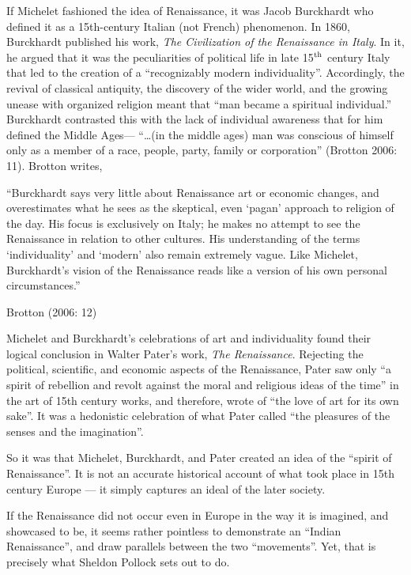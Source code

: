 If Michelet fashioned the idea of Renaissance, it was Jacob Burckhardt who defined it as a 15th-century Italian (not French) phenomenon. In 1860, Burckhardt published his work, {\sl The Civilization of the Renaissance in Italy}. In it, he argued that it was the peculiarities of political life in late 15$^{\rm th}$ century Italy that led to the creation of a “recognizably modern individuality”. Accordingly, the revival of classical antiquity, the discovery of the wider world, and the growing unease with organized religion meant that “man became a spiritual individual.” Burckhardt contrasted this with the lack of individual awareness that for him defined the Middle Ages—  “…(in the middle ages) man was conscious of himself only as a member of a race, people, party, family or corporation” (Brotton 2006: 11). Brotton writes,
\begin{myquote}
“Burckhardt says very little about Renaissance art or economic changes, and overestimates what he sees as the skeptical, even ‘pagan’ approach to religion of the day. His focus is exclusively on Italy; he makes no attempt to see the Renaissance in relation to other cultures. His understanding of the terms ‘individuality’ and ‘modern’ also remain extremely vague. Like Michelet, Burckhardt’s vision of the Renaissance reads like a version of his own personal circumstances.”  

\hfill{Brotton (2006: 12)}
\end{myquote}

Michelet and Burckhardt’s celebrations of art and individuality found their logical conclusion in Walter Pater’s work, {\sl The Renaissance}. Rejecting the political, scientific, and economic aspects of the Renaissance, Pater saw only “a spirit of rebellion and revolt against the moral and religious ideas of the time” in the art of 15th century works, and therefore, wrote of “the love of art for its own sake”. It was a hedonistic celebration of what Pater called “the pleasures of the senses and the imagination”.  

So it was that Michelet, Burckhardt, and Pater created an idea of the “spirit of Renaissance”. It is not an accurate historical account of what took place in 15th century Europe — it simply captures an ideal of the later society. 

If the Renaissance did not occur even in Europe in the way it is imagined, and showcased to be, it seems rather pointless to demonstrate an “Indian Renaissance”, and draw parallels between the two “movements”. Yet, that is precisely what Sheldon Pollock sets out to do. 

